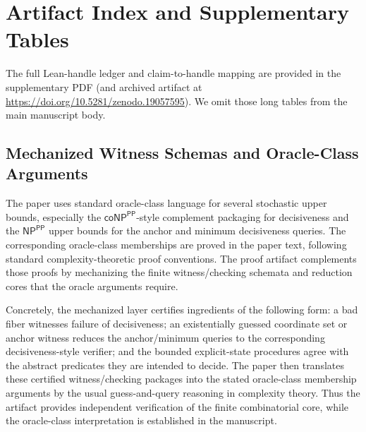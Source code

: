 \section{Artifact Index and Supplementary Tables}\label{app:lean}

The full Lean-handle ledger and claim-to-handle mapping are provided in the supplementary PDF (and archived artifact at \url{https://doi.org/10.5281/zenodo.19057595}). We omit those long tables from the main manuscript body.

\subsection*{Mechanized Witness Schemas and Oracle-Class Arguments}

The paper uses standard oracle-class language for several stochastic upper bounds, especially the $\textsf{coNP}^{\textsf{PP}}$-style complement packaging for decisiveness and the $\textsf{NP}^{\textsf{PP}}$ upper bounds for the anchor and minimum decisiveness queries. The corresponding oracle-class memberships are proved in the paper text, following standard complexity-theoretic proof conventions. The proof artifact complements those proofs by mechanizing the finite witness/checking schemata and reduction cores that the oracle arguments require.

Concretely, the mechanized layer certifies ingredients of the following form: a bad fiber witnesses failure of decisiveness; an existentially guessed coordinate set or anchor witness reduces the anchor/minimum queries to the corresponding decisiveness-style verifier; and the bounded explicit-state procedures agree with the abstract predicates they are intended to decide. The paper then translates these certified witness/checking packages into the stated oracle-class membership arguments by the usual guess-and-query reasoning in complexity theory. Thus the artifact provides independent verification of the finite combinatorial core, while the oracle-class interpretation is established in the manuscript.
